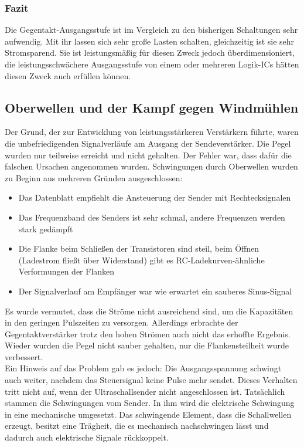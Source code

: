 \subsubsection{Fazit}
Die Gegentakt-Ausgangsstufe ist im Vergleich zu den bisherigen Schaltungen sehr aufwendig. Mit ihr lassen sich sehr große Lasten schalten, gleichzeitig ist sie sehr Stromsparend. Sie ist leistungsmäßig für diesen Zweck jedoch überdimensioniert, die leistungsschwächere Ausgangsstufe von einem oder mehreren Logik-ICs hätten diesen Zweck auch erfüllen können.


\subsection{Oberwellen und der Kampf gegen Windmühlen} %
Der Grund, der zur Entwicklung von leistungsstärkeren Verstärkern führte, waren die unbefriedigenden Signalverläufe am Ausgang der Sendeverstärker. Die Pegel wurden nur teilweise erreicht und nicht gehalten. Der Fehler war, dass dafür die falschen Ursachen angenommen wurden. Schwingungen durch Oberwellen wurden zu Beginn aus mehreren Gründen ausgeschlossen:
\begin{itemize}
	\item Das Datenblatt empfiehlt die Ansteuerung der Sender mit Rechtecksignalen
	\item Das Frequenzband des Senders ist sehr schmal, andere Frequenzen werden stark gedämpft
	\item Die Flanke beim Schließen der Transistoren sind steil, beim Öffnen (Ladestrom fließt über Widerstand) gibt es RC-Ladekurven-ähnliche Verformungen der Flanken
	\item Der Signalverlauf am Empfänger war wie erwartet ein sauberes Sinus-Signal
\end{itemize}
Es wurde vermutet, dass die Ströme nicht ausreichend sind, um die Kapazitäten in den geringen Pulszeiten zu versorgen. Allerdings erbrachte der Gegentaktverstärker trotz den hohen Strömen auch nicht das erhoffte Ergebnis. Wieder wurden die Pegel nicht sauber gehalten, nur die Flankensteilheit wurde verbessert.\\
Ein Hinweis auf das Problem gab es jedoch: Die Ausgangsspannung schwingt auch weiter, nachdem das Steuersignal keine Pulse mehr sendet. Dieses Verhalten tritt nicht auf, wenn der Ultraschallsender nicht angeschlossen ist. Tatsächlich stammen die Schwingungen vom Sender. In ihm wird die elektrische Schwingung in eine mechanische umgesetzt. Das schwingende Element, dass die Schallwellen erzeugt, besitzt eine Trägheit, die es mechanisch nachschwingen lässt und dadurch auch elektrische Signale rückkoppelt.\\ %
